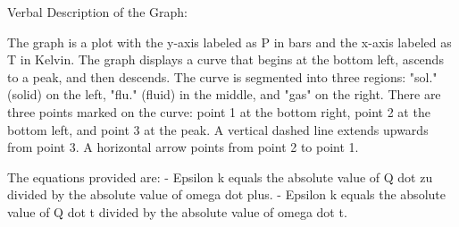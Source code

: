 Verbal Description of the Graph:

The graph is a plot with the y-axis labeled as P in bars and the x-axis labeled as T in Kelvin. The graph displays a curve that begins at the bottom left, ascends to a peak, and then descends. The curve is segmented into three regions: "sol." (solid) on the left, "flu." (fluid) in the middle, and "gas" on the right. There are three points marked on the curve: point 1 at the bottom right, point 2 at the bottom left, and point 3 at the peak. A vertical dashed line extends upwards from point 3. A horizontal arrow points from point 2 to point 1.

The equations provided are:
- Epsilon k equals the absolute value of Q dot zu divided by the absolute value of omega dot plus.
- Epsilon k equals the absolute value of Q dot t divided by the absolute value of omega dot t.